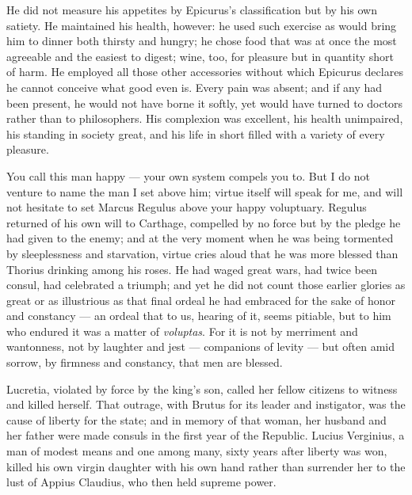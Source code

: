  He did not measure his appetites by Epicurus's classification but by his own satiety. He maintained his health, however: he used such exercise as would bring him to dinner both thirsty and hungry; he chose food that was at once the most agreeable and the easiest to digest; wine, too, for pleasure but in quantity short of harm. He employed all those other accessories without which Epicurus declares he cannot conceive what good even is. Every pain was absent; and if any had been present, he would not have borne it softly, yet would have turned to doctors rather than to philosophers. His complexion was excellent, his health unimpaired, his standing in society great, and his life in short filled with a variety of every pleasure.

 You call this man happy — your own system compels you to. But I do not venture to name the man I set above him; virtue itself will speak for me, and will not hesitate to set Marcus Regulus above your happy voluptuary. Regulus returned of his own will to Carthage, compelled by no force but by the pledge he had given to the enemy; and at the very moment when he was being tormented by sleeplessness and starvation, virtue cries aloud that he was more blessed than Thorius drinking among his roses. He had waged great wars, had twice been consul, had celebrated a triumph; and yet he did not count those earlier glories as great or as illustrious as that final ordeal he had embraced for the sake of honor and constancy — an ordeal that to us, hearing of it, seems pitiable, but to him who endured it was a matter of \textit{voluptas}. For it is not by merriment and wantonness, not by laughter and jest — companions of levity — but often amid sorrow, by firmness and constancy, that men are blessed.

 Lucretia, violated by force by the king's son, called her fellow citizens to witness and killed herself. That outrage, with Brutus for its leader and instigator, was the cause of liberty for the state; and in memory of that woman, her husband and her father were made consuls in the first year of the Republic. Lucius Verginius, a man of modest means and one among many, sixty years after liberty was won, killed his own virgin daughter with his own hand rather than surrender her to the lust of Appius Claudius, who then held supreme power.

